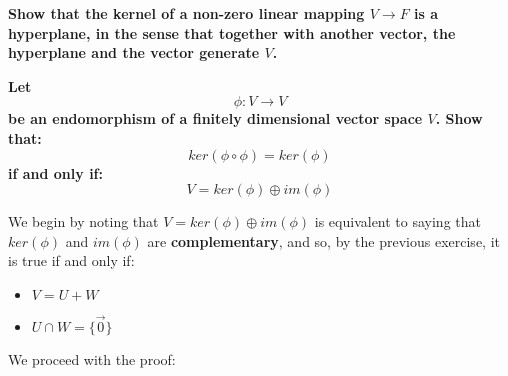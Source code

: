 \documentclass{exam}
\begin{document}
\begin{questions}
\question \textbf{Show that the kernel of a non-zero linear mapping $V \to F$ is a hyperplane, in the sense that together with another vector, the hyperplane and the vector generate $V$.}

\question \textbf{Let
\[
\phi : V \to V
\]
be an endomorphism of a finitely dimensional vector space $V$. Show that:
\[
ker(\phi \circ \phi) = ker(\phi)
\]
if and only if:
\[
V = ker(\phi) \oplus im(\phi)
\]}

We begin by noting that $V = ker(\phi) \oplus im(\phi)$ is equivalent to saying that $ker(\phi)$ and $im(\phi)$ are \textbf{complementary}, and so, by the previous exercise, it is true if and only if:
\begin{itemize}
    \item $V = U + W$
    \item $U \cap W = \{\vec{0}\}$
\end{itemize}

We proceed with the proof:


\end{questions}
\end{document}
